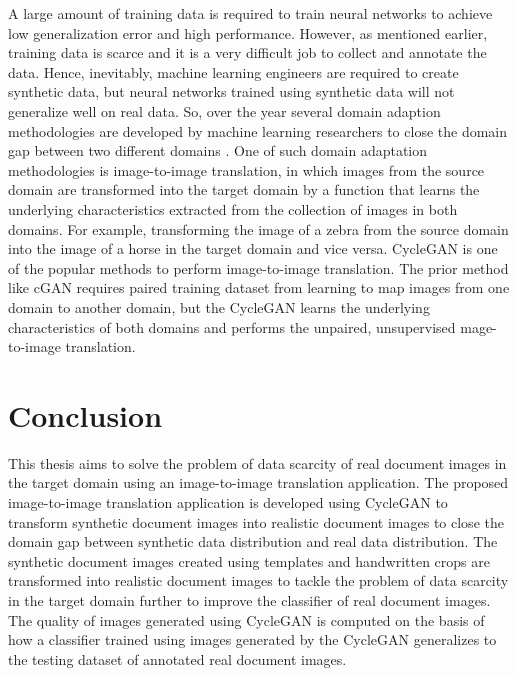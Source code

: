 A large amount of training data is required to train neural networks to achieve low generalization error and high performance. However, as mentioned earlier, training data is scarce and it is a very difficult job to collect and annotate the data. Hence, inevitably, machine learning engineers are required to create synthetic data, but neural networks trained using synthetic data will not generalize well on real data. So, over the year several domain adaption methodologies are developed by machine learning researchers to close the domain gap between two different domains \cite{farahani2020brief}. One of such domain adaptation methodologies is image-to-image translation, in which images from the source domain are transformed into the target domain by a function that learns the underlying characteristics extracted from the collection of images in both domains. For example, transforming the image of a zebra from the source domain into the image of a horse in the target domain and vice versa. \ac{CycleGAN} is one of the popular methods to perform image-to-image translation. The prior method like \ac{cGAN} requires paired training dataset from learning to map images from one domain to another domain, but the \ac{CycleGAN} learns the underlying characteristics of both domains and performs the unpaired, unsupervised mage-to-image translation.


\section{Conclusion}\label{Conclusion}

This thesis aims to solve the problem of data scarcity of real document images in the target domain using an image-to-image translation application. The proposed image-to-image translation application is developed using \ac{CycleGAN} to transform synthetic document images into realistic document images to close the domain gap between synthetic data distribution and real data distribution. The synthetic document images created using templates and handwritten crops are transformed into realistic document images to tackle the problem of data scarcity in the target domain further to improve the classifier of real document images. The quality of images generated using \ac{CycleGAN} is computed on the basis of how a classifier trained using images generated by the \ac{CycleGAN} generalizes to the testing dataset of annotated real document images. 


